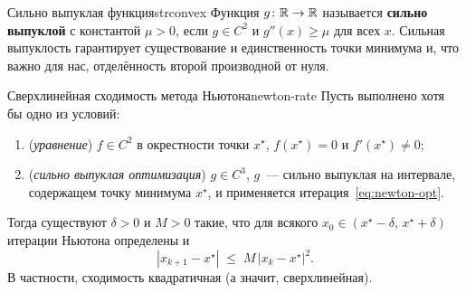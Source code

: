 \begin{definition}{Сильно выпуклая функция}{strconvex}
Функция $g\colon\mathbb{R}\to\mathbb{R}$ называется \textbf{сильно выпуклой} с
константой $\mu>0$, если $g\in C^{2}$ и $g''(x)\geq\mu$ для всех $x$.
Сильная выпуклость гарантирует существование и единственность
точки минимума и, что важно для нас, отделённость второй производной
от нуля.
\end{definition}

\begin{theorem}{Сверхлинейная сходимость метода Ньютона}{newton-rate}
Пусть выполнено хотя бы одно из условий:
\begin{enumerate}\itemsep0pt
  \item[(а)] (\emph{уравнение}) $f\in C^{2}$ в окрестности точки $x^{\star}$,
        $f(x^{\star})=0$ и $f'(x^{\star})\neq 0$;
  \item[(б)] (\emph{сильно выпуклая оптимизация}) $g\in C^{3}$,
        $g$~— сильно выпуклая на интервале, содержащем точку
        минимума $x^{\star}$, и применяется итерация~\eqref{eq:newton-opt}.
\end{enumerate}
Тогда существуют $\delta>0$ и $M>0$ такие, что для всякого
$x_0\in(x^{\star}-\delta,\,x^{\star}+\delta)$ итерации Ньютона
определены и
\begin{equation}\label{eq:rate}
|x_{k+1}-x^{\star}|\;\leq\;M\,|x_k-x^{\star}|^{2}.
\end{equation}
В частности, сходимость квадратичная (а значит, сверхлинейная).
\end{theorem}


